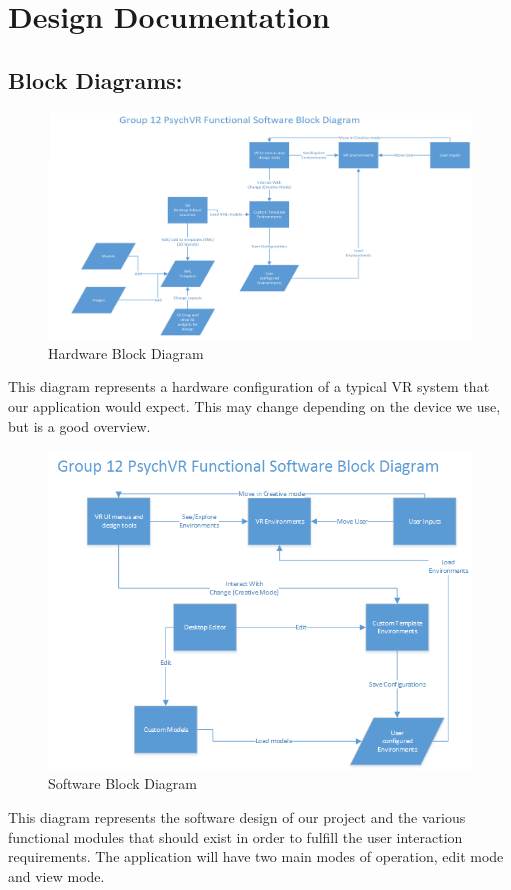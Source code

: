 \documentclass[a4paper,10pt,twoside]{article}
\begin{document}
\pagebreak
\section{Design Documentation}
	\subsection{Block Diagrams:}
	\begin{figure}[H]
	\includegraphics[width=\linewidth,height=\paperheight,keepaspectratio]{HardwareConfig.png}
	\caption{Hardware Block Diagram}
	\label{fig:hblock}
	\end{figure}
	This diagram represents a hardware configuration of a typical VR system that our application would expect. This may change depending on the device we use, but is a good overview.
	\pagebreak
	\begin{figure}[H]
	\includegraphics[width=\linewidth,height=\paperheight,keepaspectratio]{SoftwareConfig.png}
	\caption{Software Block Diagram}
	\label{fig:sblock}
	\end{figure}
	This diagram represents the software design of our project and the various functional modules that should exist in order to fulfill the user interaction requirements. 
	The application will have two main modes of operation, edit mode and view mode. 
\end{document}
